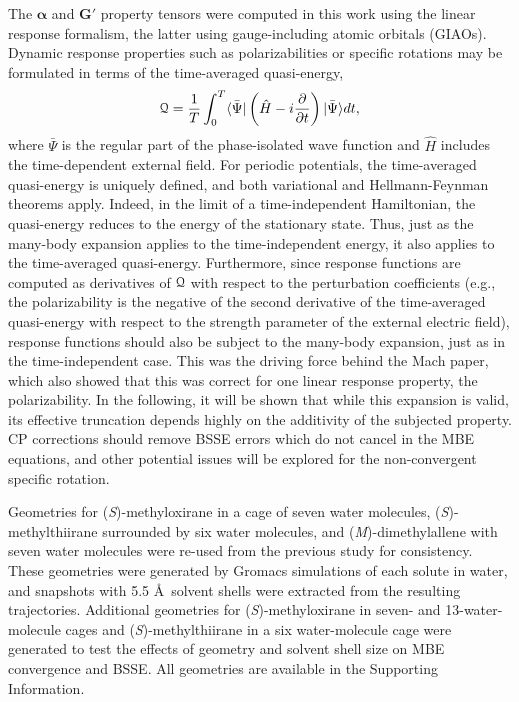     The $\boldsymbol{\alpha}$ and $\boldsymbol{G'}$ property tensors were computed in this
work using the linear response formalism\cite{Norman2011}, the latter using gauge-including atomic
orbitals (GIAOs)\cite{Pulay1990}. 
Dynamic response properties such as polarizabilities or specific rotations may
be formulated in terms of the time-averaged quasi-energy,
\begin{equation}
{\cal Q} = \frac{1}{T} \int_0^T \langle\bar{\Psi} | \left( \hat{H} -
i \frac{\partial}{\partial t}\right) | \bar{\Psi} \rangle dt,
\end{equation}
where $\bar{\Psi}$ is the regular part of the phase-isolated wave
function\cite{Langhoff72} and $\hat{H}$ includes the time-dependent
external field.  For periodic potentials, the time-averaged
quasi-energy is uniquely defined, and both variational and
Hellmann-Feynman theorems apply.\cite{Helgaker12}  Indeed, in the limit of a
time-independent Hamiltonian, the quasi-energy reduces to the energy of
the stationary state.  Thus, just as the many-body expansion applies to
the time-independent energy, it also applies to the time-averaged
quasi-energy.   Furthermore, since response functions are computed as
derivatives of ${\cal Q}$ with respect to the perturbation coefficients
(e.g., the polarizability is the negative of the second derivative of the
 time-averaged quasi-energy with respect to the strength parameter of
 the external electric field), response functions should also be
subject to the many-body expansion, just as in the time-independent
case.  This was the driving force behind the 
Mach paper, which also showed that this was correct for one linear response property, the 
polarizability\cite{Mach2014}. In the following, it will be shown that while this expansion is 
valid, its effective truncation depends highly on the additivity of the subjected property. 
CP corrections should remove BSSE errors which do not cancel in the MBE equations, and other 
potential issues will be explored for the non-convergent specific rotation.

    Geometries for (\textit{S})-methyloxirane in a cage of seven water molecules, (\textit{S})-methylthiirane surrounded by six water molecules, and (\textit{M})-dimethylallene with seven water molecules were re-used from the previous study\cite{Mach2014} for consistency. These geometries were generated by Gromacs\cite{Pronk2013} simulations of each solute in water, and snapshots with 5.5 \AA\ solvent shells were extracted from the resulting trajectories. Additional geometries for (\textit{S})-methyloxirane in seven- and 13-water-molecule cages and (\textit{S})-methylthiirane in a six water-molecule cage were generated to test the effects of geometry and solvent shell size on MBE convergence and BSSE.  All geometries are available in the Supporting Information.

